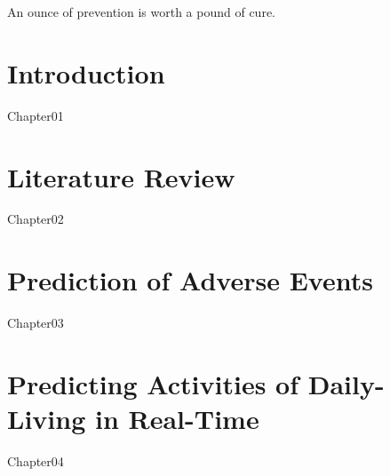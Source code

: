 \documentclass{report}
\begin{document}
 	\tableofcontents
 	
 	\BlankPage
 
 	\listoffigures
 	
 	\BlankPage
 	
 	\listoftables	
 	\BlankPage
	
	\begin{savequote}[0.55\linewidth]
		An ounce of prevention is worth a pound of cure.
	\end{savequote} 	
 	\chapter{Introduction}
 	{Chapter01}

	\chapter{Literature Review}
	{Chapter02}
	

	\chapter{Prediction of Adverse Events}
	{Chapter03}
		
	
	\chapter{Predicting Activities of Daily-Living in Real-Time}
	{Chapter04}
	
\end{document}
